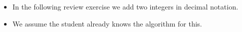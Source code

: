 \begin{frame}
\begin{itemize}
\item In the following review exercise we add two integers in decimal notation.
\item<2-> We assume the student already knows the algorithm for this.
\end{itemize}
\end{frame}
